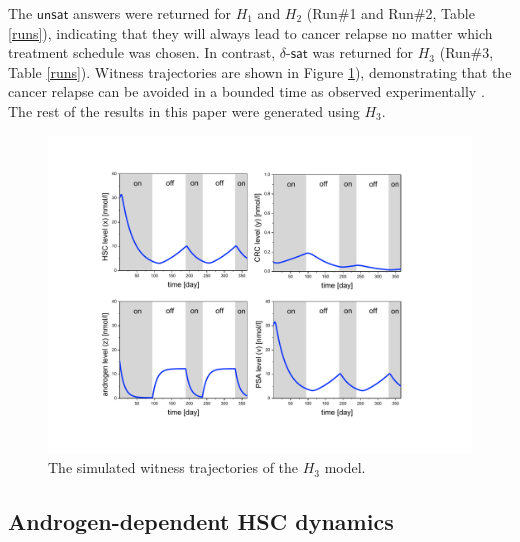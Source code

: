 The $\mathsf{unsat}$ answers were returned for $H_1$ and $H_2$ (Run\#1 and Run\#2, Table \ref{runs}), indicating that they will always lead to cancer relapse no matter which 
treatment schedule 
was chosen. In contrast, $\delta$-$\mathsf{sat}$ was returned for $H_3$ (Run\#3, Table \ref{runs}). Witness trajectories are shown in Figure \ref{prostate-fig1}), demonstrating that the cancer relapse can be avoided in a bounded time as observed experimentally \cite{ bruchovsky06,bruchovsky07}. The rest of the results in this paper were generated using $H_3$.

\begin{figure}[htb]
\centering
\includegraphics[scale=0.45]{fig-witness}
\caption{The simulated witness trajectories of the $H_3$ model.}
\label{prostate-fig1}
\vspace{-0.3cm}
\end{figure}

\subsection{Androgen-dependent HSC dynamics}

